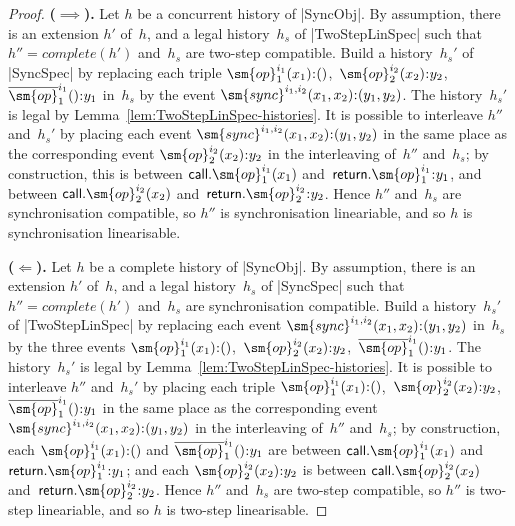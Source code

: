 \begin{proof}
\textbf{($\implies$).}\quad
%
Let $h$ be a concurrent history of |SyncObj|.  By assumption, there is an
extension $h'$ of~$h$, and a legal history~$h_s$ of |TwoStepLinSpec| such that
$h'' = complete(h')$ and~$h_s$ are two-step compatible.
%
Build a history~$h_s'$ of |SyncSpec| by replacing each triple
$\sm{op}_1^{i_1}(x_1) \:: ()$,\, $\sm{op}_2^{i_2}(x_2) \:: y_2$,\,
$\overline{\sm{op}}_1^{i_1}() \:: y_1$ in~$h_s$ by the event
$\sm{sync}^{i_1,i_2}(x_1,x_2) \:: (y_1,y_2)$.  
%
The history~$h_s'$ is legal by Lemma~\ref{lem:TwoStepLinSpec-histories}.  
%
It is possible to interleave $h''$ and~$h_s'$ by placing each event
$\sm{sync}^{i_1,i_2}(x_1,x_2) \:: (y_1,y_2)$ in the same place as the
corresponding event $\sm{op}_2^{i_2}(x_2) \:: y_2$ in the interleaving
of~$h''$ and~$h_s$; by construction, this is between
$\call.\sm{op}_1^{i_1}(x_1)$ and~$\return.\sm{op}_1^{i_1} \:: y_1$, and
between $\call.\sm{op}_2^{i_2}(x_2)$ and~$\return.\sm{op}_2^{i_2} \:: y_2$.
%
Hence $h''$ and~$h_s$ are synchronisation compatible, so $h''$ is
synchronisation lineariable, and so $h$ is synchronisation linearisable.


\textbf{($\Leftarrow$).}\quad
%
Let $h$ be a complete history of |SyncObj|.  By assumption, there is an
extension $h'$ of~$h$, and a legal history~$h_s$ of |SyncSpec| such that $h''
= complete(h')$ and~$h_s$ are synchronisation compatible.
%
Build a history~$h_s'$ of |TwoStepLinSpec| by replacing each event
$\sm{sync}^{i_1,i_2}(x_1,x_2) \:: (y_1,y_2)$ in~$h_s$ by the three events
$\sm{op}_1^{i_1}(x_1) \:: ()$,\, $\sm{op}_2^{i_2}(x_2) \:: y_2$,\,
$\overline{\sm{op}}_1^{i_1}() \:: y_1$.
%
The history~$h_s'$ is legal by Lemma~\ref{lem:TwoStepLinSpec-histories}.
%
It is possible to interleave $h''$ and~$h_s'$ by placing each triple
$\sm{op}_1^{i_1}(x_1) \:: ()$,\, $\sm{op}_2^{i_2}(x_2) \:: y_2$,\,
$\overline{\sm{op}}_1^{i_1}() \:: y_1$ in the same place as the corresponding
event $\sm{sync}^{i_1,i_2}(x_1,x_2) \:: (y_1,y_2)$ in the interleaving
of~$h''$ and~$h_s$; by construction, each $\sm{op}_1^{i_1}(x_1) \:: ()$ and
$\overline{\sm{op}}_1^{i_1}() \:: y_1$ are between
$\call.\sm{op}_1^{i_1}(x_1)$ and~$\return.\sm{op}_1^{i_1} \:: y_1$; and each
$\sm{op}_2^{i_2}(x_2) \:: y_2$ is between $\call.\sm{op}_2^{i_2}(x_2)$
and~$\return.\sm{op}_2^{i_2} \:: y_2$.
%
Hence $h''$ and~$h_s$ are two-step compatible, so $h''$ is two-step
lineariable, and so $h$ is two-step linearisable.
\end{proof}

